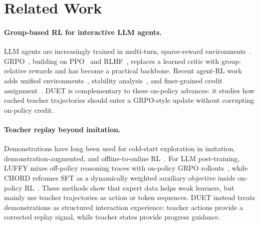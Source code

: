 
\section{Related Work}

\paragraph{Group-based RL for interactive LLM agents.}
LLM agents are increasingly trained in multi-turn, sparse-reward environments~\citep{shridhar2020alfworld,yao2022webshop,yao2022react}. GRPO~\citep{shao2024deepseekmath}, building on PPO~\citep{schulman2017ppo} and RLHF~\citep{ouyang2022training}, replaces a learned critic with group-relative rewards and has become a practical backbone. Recent agent-RL work adds unified environments~\citep{xi2024agentgym}, stability analysis~\citep{wang2025ragen}, and finer-grained credit assignment~\citep{feng2025gigpo}. DUET is complementary to these on-policy advances: it studies how cached teacher trajectories should enter a GRPO-style update without corrupting on-policy credit.

\paragraph{Teacher replay beyond imitation.}
Demonstrations have long been used for cold-start exploration in imitation, demonstration-augmented, and offline-to-online RL~\citep{ross2011dagger,hester2018deep,nair2020awac,kostrikov2022iql}. For LLM post-training, LUFFY mixes off-policy reasoning traces with on-policy GRPO rollouts~\citep{yan2025luffy}, while CHORD reframes SFT as a dynamically weighted auxiliary objective inside on-policy RL~\citep{zhang2025chord}. These methods show that expert data helps weak learners, but mainly use teacher trajectories as action or token sequences. DUET instead treats demonstrations as structured interaction experience: teacher actions provide a corrected replay signal, while teacher states provide progress guidance.

